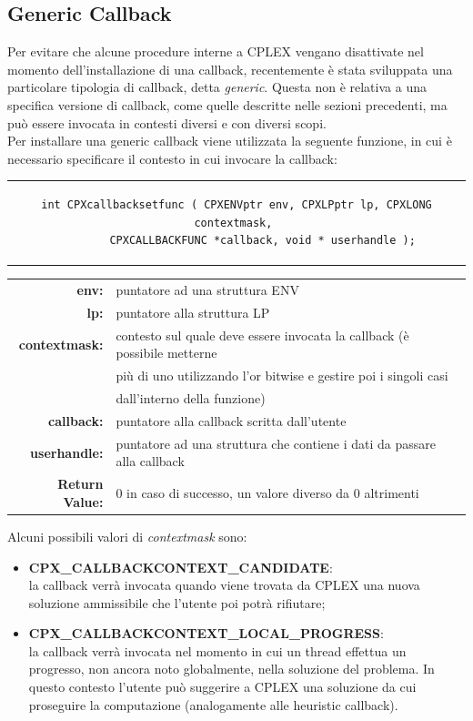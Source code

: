 \subsection{Generic Callback}%
Per evitare che alcune procedure interne a CPLEX vengano disattivate nel momento dell'installazione di una callback, recentemente è stata sviluppata una particolare tipologia di callback, detta \textit{generic}. Questa non è relativa a una specifica versione di callback, come quelle descritte nelle sezioni precedenti, ma può essere invocata in contesti diversi e con diversi scopi.\\
Per installare una generic callback viene utilizzata la seguente funzione, in cui  è necessario specificare il contesto in cui invocare la callback:
\begin{center}
\begin{tabular}{c}
\begin{lstlisting}[linewidth=380pt, basicstyle=\footnotesize\sffamily,]    
int CPXcallbacksetfunc ( CPXENVptr env, CPXLPptr lp, CPXLONG contextmask, 
		CPXCALLBACKFUNC *callback, void * userhandle );
\end{lstlisting}
\end{tabular}
\end{center}
\begin{table}[h]
\centering
\begin{tabular}{rl}
\textbf{env:} & {puntatore ad una struttura ENV}\\
\textbf{lp:} & {puntatore alla struttura LP}\\
\textbf{contextmask:} & {contesto sul quale deve essere invocata la callback (è possibile metterne}\\
&{più di uno utilizzando l'or bitwise e gestire poi i singoli casi }\\
&{dall'interno della funzione)}\\
\textbf{callback:} & {puntatore alla callback scritta dall'utente} \\
\textbf{userhandle:} & {puntatore ad una struttura che contiene i dati da passare alla callback} \\
\textbf{Return Value:} & {0 in caso di successo, un valore diverso da 0 altrimenti}\\
\end{tabular}
\end{table}
Alcuni possibili valori di \textit{contextmask} sono:
\begin{itemize}
\item{\textbf{CPX\_CALLBACKCONTEXT\_CANDIDATE}:\\la callback verrà invocata quando viene trovata da CPLEX una nuova soluzione ammissibile che l'utente poi potrà rifiutare;}
\item{\textbf{CPX\_CALLBACKCONTEXT\_LOCAL\_PROGRESS}: \\la callback verrà invocata nel momento in cui un thread effettua un progresso, non ancora noto globalmente, nella soluzione del problema. In questo contesto l'utente può suggerire a CPLEX una soluzione da cui proseguire la computazione (analogamente alle heuristic callback).}\\
\end{itemize}
